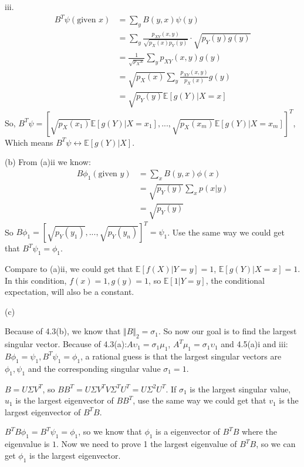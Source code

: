 \documentclass[a4paper]{article}
\begin{document}
iii.
\begin{equation*}
\begin{aligned}
B^T \psi(\text{given }x) &= \sum_{y} B(y,x)\psi(y)\\
&= \sum_y \frac{p_{XY}(x,y)}{\sqrt{p_X(x)p_Y(y)}} \cdot \sqrt{p_Y(y) g(y)}\\
&=\frac{1}{\sqrt{p_X{x}}} \sum_y p_{XY}(x,y)g(y)\\
&= \sqrt{p_X(x)} \sum_y \frac{p_{XY}(x,y)}{p_{X}(x)}g(y)\\
&= \sqrt{p_Y(y)} \mathbb{E}[g(Y)\vert X = x] 
\end{aligned}
\end{equation*}
So, $B^T\psi =[\sqrt{p_X(x_1)}\mathbb{E}[g(Y)\vert X = x_1],...,\sqrt{p_X(x_m)}\mathbb{E}[g(Y)\vert X = x_m]]^T $, Which means $B^T\psi \leftrightarrow\mathbb{E}[g(Y)\vert X ]$.

(b)
From (a)ii we know:
$$
\begin{aligned}
B\phi_1(\text{given }y) &= \sum_{x} B(y,x)\phi(x)\\
&= \sqrt{p_Y(y)}\sum_{x}p(x|y)\\
&= \sqrt{p_Y(y)}
\end{aligned}
$$
So $B\phi_1 = [\sqrt{p_Y(y_1)},...,\sqrt{p_Y(y_n)}]^T = \psi_1$. Use the same way we could get that $B^T\psi_1 = \phi_1$.

Compare to (a)ii, we could get that $\mathbb{E}[f(X)\vert Y = y] = 1$, $\mathbb{E}[g(Y)\vert X = x]=1$. In this condition, $f(x)=1,g(y)=1$, so $\mathbb{E}[1|Y=y]$, the conditional expectation, will also be a constant.

(c)

Because of  4.3(b), we know that $\Vert B \Vert_2 = \sigma_1$. So now our goal is to find the largest singular vector. Because of 4.3(a):$A\upsilon_1 = \sigma_1\mu_1$, $A^T\mu_1 = \sigma_1 \upsilon_1 $ and 4.5(a)i and iii:$B\phi_1 = \psi_1,B^T\psi_1 = \phi_1$, a rational guess is that the largest singular vectors are $\phi_1,\psi_1$ and the corresponding singular value  $\sigma_1 = 1$.

$B = U\Sigma V^T$, so $BB^T = U\Sigma V^T V \Sigma^T U^T = U\Sigma^2 U^T$. If $\sigma_1$ is the largest singular value, $u_1$ is the largest eigenvector of $BB^T$, use the same way we could get that $v_1$ is the largest eigenvector of $B^TB$.

$B^TB\phi_1 = B^T\psi_1 = \phi_1$, so we know that $\phi_1$ is a eigenvector of $B^TB$ where the eigenvalue is $1$. Now we need to prove 1 the largest eigenvalue of $B^TB$, so we can get $\phi_1$ is the largest eigenvector. 
\end{document}
